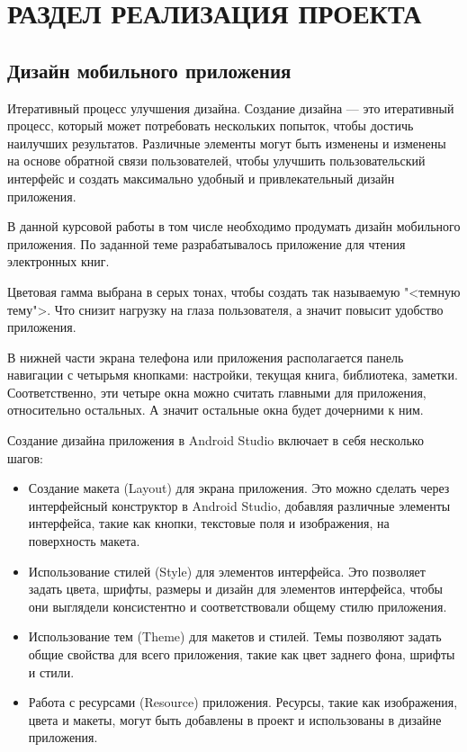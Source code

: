 \chapter{РАЗДЕЛ РЕАЛИЗАЦИЯ ПРОЕКТА}
\section{Дизайн мобильного приложения}
Итеративный процесс улучшения дизайна.
Создание дизайна --- это итеративный процесс,
который может потребовать нескольких попыток,
чтобы достичь наилучших результатов.
Различные элементы могут быть изменены и изменены на основе обратной связи
пользователей, чтобы улучшить пользовательский интерфейс
и создать максимально удобный и привлекательный дизайн приложения.\par
В данной курсовой работы в том числе необходимо продумать дизайн
мобильного приложения. По заданной теме разрабатывалось
приложение для чтения электронных книг.\par
Цветовая гамма выбрана в серых тонах, чтобы создать так называемую "<темную
тему">. Что снизит нагрузку на глаза пользователя, а значит повысит удобство
приложения.\par
В нижней части экрана телефона или приложения располагается
панель навигации с четырьмя кнопками: настройки, текущая книга,
библиотека, заметки. Соответственно, эти четыре окна можно считать главными
для приложения, относительно остальных. А значит остальные окна будет
дочерними к ним.\par
Создание дизайна приложения в Android Studio включает в себя несколько шагов:

\begin{itemize}
	\item Создание макета (Layout) для экрана приложения.
		Это можно сделать через интерфейсный конструктор в Android Studio,
		добавляя различные элементы интерфейса, такие как кнопки,
		текстовые поля и изображения, на поверхность макета.
	\item Использование стилей (Style) для элементов интерфейса.
		Это позволяет задать цвета, шрифты, размеры и дизайн
		для элементов интерфейса, чтобы они выглядели консистентно
		и соответствовали общему стилю приложения.
	\item Использование тем (Theme) для макетов и стилей.
		Темы позволяют задать общие свойства для всего приложения,
		такие как цвет заднего фона, шрифты и стили.
	\item Работа с ресурсами (Resource) приложения.
		Ресурсы, такие как изображения, цвета и макеты,
		могут быть добавлены в проект и использованы в дизайне приложения.
\end{itemize}
